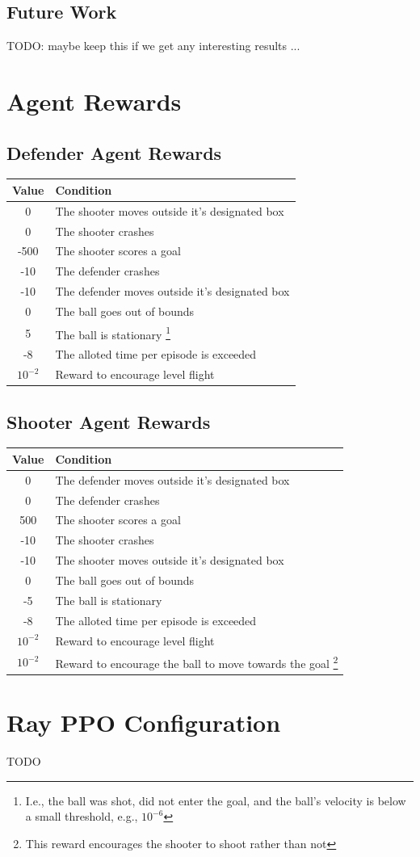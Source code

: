 \documentclass{article}
\begin{document}
\subsection{Future Work} \label{subsec:future_work}
TODO: maybe keep this if we get any interesting results ... 

\clearpage 
\appendix
\section{Agent Rewards}\label{app:rewards}
\subsection{Defender Agent Rewards}
\begin{tabular}{ | c | l | }
\hline
Value & Condition \\ \hline
0 & The shooter moves outside it's designated box \\ \hline
0 & The shooter crashes \\ \hline
-500 & The shooter scores a goal \\ \hline 
-10 & The defender crashes \\ \hline
-10 & The defender moves outside it's designated box \\ \hline 
0 & The ball goes out of bounds \\ \hline 
5 & The ball is stationary \footnote{I.e., the ball was shot, did not enter the goal, and the ball's velocity is below a small threshold, e.g., $10^{-6}$} \\ \hline
-8 & The alloted time per episode is exceeded \\ \hline 
$10^{-2}$ & Reward to encourage level flight \\ \hline
\end{tabular}

\subsection{Shooter Agent Rewards}
\begin{tabular}{ | c | l | }
\hline
Value & Condition \\ \hline
0 & The defender moves outside it's designated box \\ \hline
0 & The defender crashes \\ \hline
500 & The shooter scores a goal \\ \hline 
-10 & The shooter crashes \\ \hline
-10 & The shooter moves outside it's designated box \\ \hline 
0 & The ball goes out of bounds \\ \hline 
-5 & The ball is stationary  \\ \hline
-8 & The alloted time per episode is exceeded \\ \hline 
$10^{-2}$ & Reward to encourage level flight \\ \hline
$10^{-2}$ & Reward to encourage the ball to move towards the goal \footnote{This reward encourages the shooter to shoot rather than not} \\ \hline
\end{tabular}

\section{Ray PPO Configuration} \label{app:ray_config}
TODO


\newpage


\end{document}
